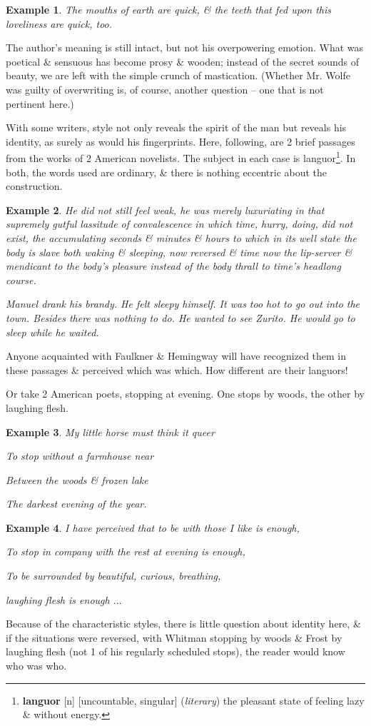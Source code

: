 \documentclass[oneside]{book}
\numberwithin{equation}{section}
\newtheorem{example}{Example}[chapter]
\begin{document}
\begin{example}
	The mouths of earth are quick, \& the teeth that fed upon this loveliness are quick, too.
\end{example}
The author's meaning is still intact, but not his overpowering emotion. What was poetical \& sensuous has become prosy \& wooden; instead of the secret sounds of beauty, we are left with the simple crunch of mastication. (Whether Mr. Wolfe was guilty of overwriting is, of course, another question -- one that is not pertinent here.)

With some writers, style not only reveals the spirit of the man but reveals his identity, as surely as would his fingerprints. Here, following, are 2 brief passages from the works of 2 American novelists. The subject in each case is languor\footnote{\textbf{languor} [n] [uncountable, singular] (\textit{literary}) the pleasant state of feeling lazy \& without energy.}. In both, the words used are ordinary, \& there is nothing eccentric about the construction.

\begin{example}
	He did not still feel weak, he was merely luxuriating in that supremely gutful lassitude of convalescence in which time, hurry, doing, did not exist, the accumulating seconds \& minutes \& hours to which in its well state the body is slave both waking \& sleeping, now reversed \& time now the lip-server \& mendicant to the body's pleasure instead of the body thrall to time's headlong course.
	
	Manuel drank his brandy. He felt sleepy himself. It was too hot to go out into the town. Besides there was nothing to do. He wanted to see Zurito. He would go to sleep while he waited.
\end{example}
Anyone acquainted with Faulkner \& Hemingway will have recognized them in these passages \& perceived which was which. How different are their languors!

Or take 2 American poets, stopping at evening. One stops by woods, the other by laughing flesh.

\begin{example}
	My little horse must think it queer
	
	To stop without a farmhouse near
	
	Between the woods \& frozen lake
	
	The darkest evening of the year.
\end{example}

\begin{example}
	I have perceived that to be with those I like is enough,
	
	To stop in company with the rest at evening is enough,
	
	To be surrounded by beautiful, curious, breathing,
	
	laughing flesh is enough $\ldots$
\end{example}
Because of the characteristic styles, there is little question about identity here, \& if the situations were reversed, with Whitman stopping by woods \& Frost by laughing flesh (not 1 of his regularly scheduled stops), the reader would know who was who.
\end{document}
